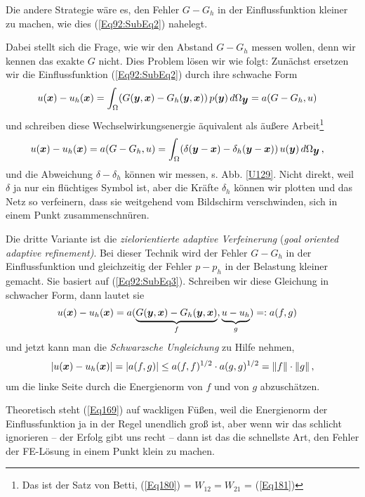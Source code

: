 {Die andere Strategie w\"{a}re es, den Fehler $G-G_h$ in der Einflussfunktion kleiner zu machen, wie dies (\ref{Eq92:SubEq2}) nahelegt.

Dabei stellt sich die Frage, wie wir den Abstand $G - G_h$ messen wollen, denn wir kennen das exakte $G$ nicht. Dies Problem l\"{o}sen wir wie folgt: Zun\"{a}chst ersetzen wir die Einflussfunktion (\ref{Eq92:SubEq2}) durch ihre schwache Form
\begin{align}\label{Eq180}
u(\mbox{\boldmath $x$}) - u_h(\mbox{\boldmath $x$}) &= \int_{\Omega} (G(\mbox{\boldmath $y$},\mbox{\boldmath $x$}) - G_h(\mbox{\boldmath $y$},\mbox{\boldmath $x$}))\,p(\mbox{\boldmath $y$})\,d\Omega_{\mbox{\boldmath $y$}} = a(G - G_h,u)
\end{align}
und schreiben diese Wechselwirkungsenergie \"{a}quivalent als \"{a}u{\ss}ere Arbeit\footnote{Das ist der Satz von Betti, (\ref{Eq180}) = $W_{12} = W_{21}$ = (\ref{Eq181})}
\begin{align}\label{Eq181}
u(\mbox{\boldmath $x$}) - u_h(\mbox{\boldmath $x$}) &=a(G - G_h,u) = \int_{\Omega} (\delta(\mbox{\boldmath $y$} -\mbox{\boldmath $x$}) - \delta_h(\mbox{\boldmath $y$} -\mbox{\boldmath $x$}))\,u(\mbox{\boldmath $y$})\,d\Omega_{\mbox{\boldmath $y$}}\,,
\end{align}
und die Abweichung $\delta - \delta_h$ k\"{o}nnen wir messen, s. Abb. \ref{U129}. Nicht direkt, weil $\delta$ ja nur ein fl\"{u}chtiges Symbol ist, aber die Kr\"{a}fte $\delta_h$ k\"{o}nnen wir plotten und das Netz so verfeinern, dass sie weitgehend vom Bildschirm verschwinden, sich in einem Punkt zusammenschn\"{u}ren.

Die dritte Variante ist die {\em zielorientierte adaptive Verfeinerung\/} ({\em goal oriented adaptive refinement)\/}. Bei dieser Technik wird der Fehler $G- G_h$ in der Einflussfunktion und gleichzeitig der Fehler $p - p_h$ in der Belastung kleiner gemacht. Sie basiert auf (\ref{Eq92:SubEq3}). Schreiben wir diese Gleichung in schwacher Form, dann lautet sie
\begin{align}
u(\vek x) - u_h(\vek x) &= a(\underbrace{G(\vek y,\vek x) - G_h(\vek y,\vek x)}_f, \underbrace{\vphantom{G(\vek y,\vek x)} u - u_h}_g) =: a(f,g)
\end{align}
und jetzt kann man die {\em Schwarzsche Ungleichung\/} zu Hilfe nehmen,
\begin{align}\label{Eq169}
|u(\mbox{\boldmath $x$}) - u_h(\mbox{\boldmath $x$})| = | a(f,g)|  \leq a(f,f)^{1/2} \cdot a(g,g)^{1/2} = \|f\| \cdot \|g\|\,,
\end{align}
um die linke Seite durch die Energienorm von $f$  und von $g$ abzusch\"{a}tzen.

Theoretisch steht (\ref{Eq169}) auf \glq wackligen F\"{u}{\ss}en\grq{}, weil die Energienorm der Einflussfunktion ja in der Regel unendlich gro{\ss} ist, aber wenn wir das schlicht ignorieren -- der Erfolg gibt uns recht -- dann ist das die schnellste Art, den Fehler der FE-L\"{o}sung in einem Punkt klein zu machen.

}
